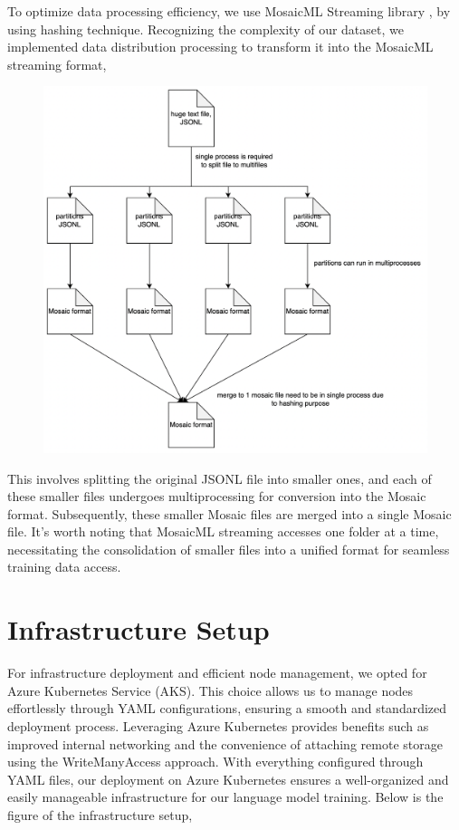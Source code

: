 \documentclass{article}
\begin{document}
To optimize data processing efficiency, we use MosaicML Streaming library \cite{mosaicml2022streaming}, by using hashing technique. Recognizing the complexity of our dataset, we implemented data distribution processing to transform it into the MosaicML streaming format,

\begin{figure}[h]
  \centering
  \includegraphics[width=0.6\linewidth]{pic/how-to-mosaic.png} %
\end{figure}

This involves splitting the original JSONL file into smaller ones, and each of these smaller files undergoes multiprocessing for conversion into the Mosaic format. Subsequently, these smaller Mosaic files are merged into a single Mosaic file. It's worth noting that MosaicML streaming accesses one folder at a time, necessitating the consolidation of smaller files into a unified format for seamless training data access.

\section{Infrastructure Setup}

For infrastructure deployment and efficient node management, we opted for Azure Kubernetes Service (AKS). This choice allows us to manage nodes effortlessly through YAML configurations, ensuring a smooth and standardized deployment process. Leveraging Azure Kubernetes provides benefits such as improved internal networking and the convenience of attaching remote storage using the WriteManyAccess approach. With everything configured through YAML files, our deployment on Azure Kubernetes ensures a well-organized and easily manageable infrastructure for our language model training. Below is the figure of the infrastructure setup,
\end{document}
